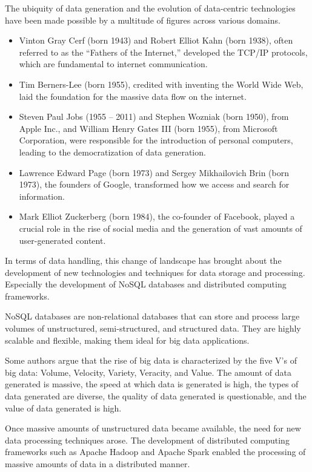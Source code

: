 The ubiquity of data generation and the evolution of data-centric technologies have been
made possible by a multitude of figures across various domains.

\begin{itemize}
  \itemsep0em
  \item Vinton Gray Cerf (born 1943) and Robert Elliot Kahn (born 1938), often referred to
    as the ``Fathers of the Internet,'' developed the TCP/IP protocols, which are
    fundamental to internet communication.
  \item Tim Berners-Lee (born 1955), credited with inventing the World Wide Web, laid the
    foundation for the massive data flow on the internet.
  \item Steven Paul Jobs (1955 -- 2011) and Stephen Wozniak (born 1950), from Apple Inc.,
    and William Henry Gates III (born 1955), from Microsoft Corporation, were responsible
    for the introduction of personal computers, leading to the democratization of data
    generation.
  \item Lawrence Edward Page (born 1973) and Sergey Mikhailovich Brin (born 1973), the
    founders of Google, transformed how we access and search for information.
  \item Mark Elliot Zuckerberg (born 1984), the co-founder of Facebook, played a crucial
    role in the rise of social media and the generation of vast amounts of user-generated
    content.
\end{itemize}

In terms of data handling, this change of landscape has brought about the
development of new technologies and techniques for data storage and processing.  Especially
the development of NoSQL databases and distributed computing frameworks.

NoSQL databases are non-relational databases that can store and process large volumes of
unstructured, semi-structured, and structured data.  They are highly scalable and
flexible, making them ideal for big data applications.

Some authors argue that the rise of big data is characterized by the five V's of big data:
Volume, Velocity, Variety, Veracity, and Value.  The amount of data generated is massive,
the speed at which data is generated is high, the types of data generated are diverse, the
quality of data generated is questionable, and the value of data generated is high.

Once massive amounts of unstructured data became available, the need for new data
processing techniques arose.  The development of distributed computing frameworks such as
Apache Hadoop and Apache Spark enabled the processing of massive amounts of data in a
distributed manner.

